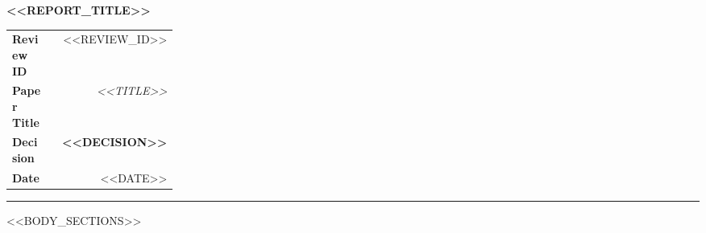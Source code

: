 \documentclass[11pt,a4paper]{article}
\newcommand{\reporttitle}[1]{%
  {\sffamily\LARGE\bfseries #1}%
}
\newcommand{\metalabel}[1]{%
  {\bfseries #1}%
}
\begin{document}
\begin{center}
  \reporttitle{<<REPORT_TITLE>>}
\end{center}

\vspace{0.4em}
\noindent\begin{tabularx}{\linewidth}{@{}p{0.24\linewidth}R@{}}
\metalabel{Review ID} & <<REVIEW_ID>> \\
\metalabel{Paper Title} & \textit{<<TITLE>>} \\
\metalabel{Decision} & \textbf{\color{accent}<<DECISION>>} \\
\metalabel{Date} & <<DATE>> \\
\end{tabularx}

\vspace{0.8em}
{\color{rulegray}\hrule}

<<BODY_SECTIONS>>
\end{document}
